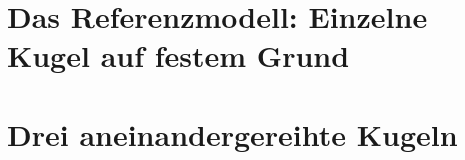 


\chapter{Das Referenzmodell: Einzelne Kugel auf festem Grund}

\chapter{Drei aneinandergereihte Kugeln}

